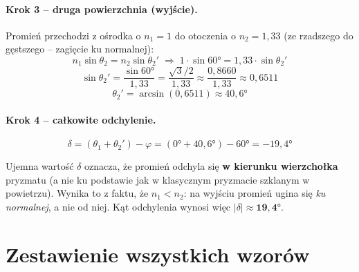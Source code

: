 \documentclass[12pt,a4paper]{article}
\begin{document}
\paragraph{Krok 3 – druga powierzchnia (wyjście).}
Promień przechodzi z ośrodka o $n_1 = 1$ do otoczenia o $n_2 = 1{,}33$
(ze rzadszego do gęstszego -- zagięcie ku normalnej):
\[
  n_1 \sin\theta_2 = n_2 \sin\theta_2'
  \;\Longrightarrow\;
  1 \cdot \sin 60° = 1{,}33 \cdot \sin\theta_2'
\]
\[
  \sin\theta_2' = \frac{\sin 60°}{1{,}33}
               = \frac{\sqrt{3}/2}{1{,}33}
               \approx \frac{0{,}8660}{1{,}33}
               \approx 0{,}6511
\]
\[
  \boxed{\theta_2' = \arcsin(0{,}6511) \approx 40{,}6°}
\]

\paragraph{Krok 4 – całkowite odchylenie.}

\begin{wzorbox}
\[
  \delta = (\theta_1 + \theta_2') - \varphi
         = (0° + 40{,}6°) - 60°
         = -19{,}4°
\]
\end{wzorbox}

\begin{objasnbox}
Ujemna wartość $\delta$ oznacza, że promień odchyla się
\textbf{w kierunku wierzchołka} pryzmatu (a nie ku podstawie jak
w klasycznym pryzmacie szklanym w powietrzu).
Wynika to z faktu, że $n_1 < n_2$: na wyjściu promień ugina się
\emph{ku normalnej}, a nie od niej.
Kąt odchylenia wynosi więc $|\delta| \approx \mathbf{19{,}4°}$.
\end{objasnbox}

\section{Zestawienie wszystkich wzorów}
\end{document}
